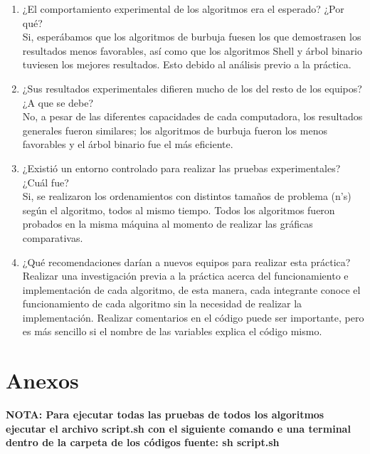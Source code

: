 \documentclass[12pt]{article}
\begin{document}
\begin{enumerate}
		        
		        \item ¿El comportamiento experimental de los algoritmos era el esperado? ¿Por qué?\\
		        Si, esperábamos que los algoritmos de burbuja fuesen los que demostrasen los resultados menos favorables, así como que los algoritmos Shell y árbol binario tuviesen los mejores resultados. Esto debido al análisis previo a la práctica.\\
		        
		        \item ¿Sus resultados experimentales difieren mucho de los del resto de los equipos? ¿A que se debe?\\
		        No, a pesar de las diferentes capacidades de cada computadora, los resultados generales fueron similares; los algoritmos de burbuja fueron los menos favorables y el árbol binario fue el más eficiente.\\
		        
		        \item ¿Existió un entorno controlado para realizar las pruebas experimentales? ¿Cuál fue?\\
		        Si, se realizaron los ordenamientos con distintos tamaños de problema (n's) según el algoritmo, todos al mismo tiempo. Todos los algoritmos fueron probados en la misma máquina al momento de realizar las gráficas comparativas.\\
		        
		        \item ¿Qué recomendaciones darían a nuevos equipos para realizar esta práctica?\\
		        Realizar una investigación previa a la práctica acerca del funcionamiento e implementación de cada algoritmo, de esta manera, cada integrante conoce el funcionamiento de cada algoritmo sin la necesidad de realizar la implementación. Realizar comentarios en el código puede ser importante, pero es más sencillo si el nombre de las variables explica el código mismo.
		        
		    \end{enumerate}
	\newpage
	\section{Anexos}
	
	\textbf{NOTA: Para ejecutar todas las pruebas de todos los algoritmos ejecutar el archivo script.sh con el siguiente comando e una terminal dentro de la carpeta de los códigos fuente: sh script.sh}
\end{document}
